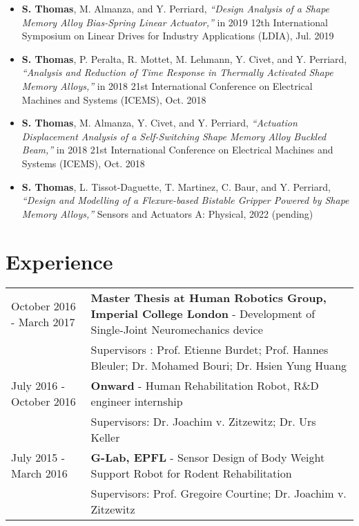 \begin{itemize}
\item[] \textbf{S. Thomas}, M. Almanza, and Y. Perriard, \textit{“Design Analysis of a Shape Memory Alloy Bias-Spring Linear Actuator,”} in 2019 12th International Symposium on Linear Drives for Industry Applications (LDIA), Jul. 2019\\
\item[] \textbf{S. Thomas}, P. Peralta, R. Mottet, M. Lehmann, Y. Civet, and Y. Perriard, \textit{“Analysis and Reduction of Time Response in Thermally Activated Shape Memory Alloys,”} in 2018 21st International Conference on Electrical Machines and Systems (ICEMS), Oct. 2018\\
\item[] \textbf{S. Thomas}, M. Almanza, Y. Civet, and Y. Perriard, \textit{“Actuation Displacement Analysis of a Self-Switching Shape Memory Alloy Buckled Beam,”} in 2018 21st International Conference on Electrical Machines and Systems (ICEMS), Oct. 2018\\
\item[] \textbf{S. Thomas}, L. Tissot-Daguette, T. Martinez, C. Baur, and Y. Perriard, \textit{“Design and Modelling of a Flexure-based Bistable Gripper Powered by Shape Memory Alloys,”} Sensors and Actuators A: Physical, 2022 (pending)
\end{itemize}

\section*{Experience}
\hrulefill

\begin{tabular}{p{5cm}p{8.75cm}}
    October 2016 - March 2017 & \textbf{Master Thesis at Human Robotics Group, Imperial College London} - Development of Single-Joint Neuromechanics device\\
    & Supervisors : Prof. Etienne Burdet; Prof. Hannes Bleuler; Dr. Mohamed Bouri; Dr. Hsien Yung Huang\\
    July 2016 - October 2016 & \textbf{Onward} - Human Rehabilitation Robot, R\&D engineer internship\\
    & Supervisors: Dr. Joachim v. Zitzewitz; Dr. Urs Keller\\
    July 2015 - March 2016 & \textbf{G-Lab, EPFL} - Sensor Design of Body Weight Support Robot for Rodent Rehabilitation\\
    & Supervisors: Prof. Gregoire Courtine; Dr. Joachim v. Zitzewitz
\end{tabular}

